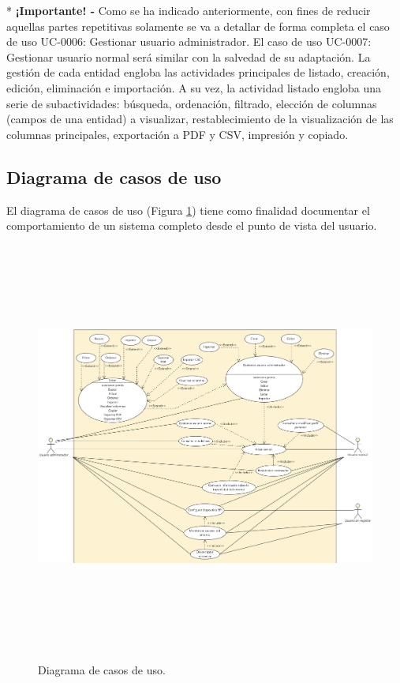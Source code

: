 \documentclass[12pt,a4paper, twoside]{report}
\begin{document}
	{\color{black!40!blue}*} \textbf{¡Importante! -} Como se ha indicado anteriormente, con fines de reducir aquellas partes repetitivas solamente se va a detallar de forma completa el caso de uso UC-0006: Gestionar usuario administrador. El caso de uso UC-0007: Gestionar usuario normal será similar con la salvedad de su adaptación. La gestión de cada entidad engloba las actividades principales de listado, creación, edición, eliminación e importación. A su vez, la actividad listado engloba una serie de subactividades: búsqueda, ordenación, filtrado, elección de columnas (campos de una entidad) a visualizar, restablecimiento de la visualización de las columnas principales, exportación a PDF y CSV, impresión y copiado.

	\subsection{Diagrama de casos de uso}
	
	El diagrama de casos de uso (Figura \ref{fig:use_case}) tiene como finalidad documentar el comportamiento de un sistema completo desde el punto de vista del usuario.
	
	\newpage
	
	\begin{figure}[!ht]   
		\caption{Diagrama de casos de uso.} 
		\begin{center} 
	 		\includegraphics[width=18cm,height=13.5cm]{Images/analysis/useCases} \\
			\label{fig:use_case} 
		\end{center}  
	\end{figure} 	
	
\end{document}
